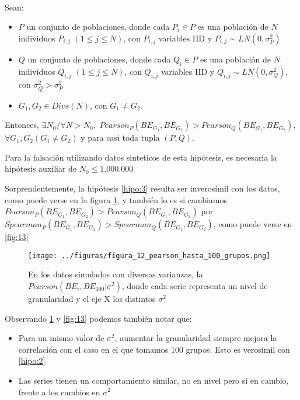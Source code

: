 \begin{hipotesis}\label{hipo:3}
    \\

    Sean:

    \begin{itemize}
    \item $P$ un conjunto de poblaciones, donde cada $P_i \in P$ es una población de $N$ individuos $P_{i,j}$ $(1 \leq j \leq N)$, con $P_{i,j}$ variables IID y $P_{i,j} \sim LN(0,\sigma_P^2)$ 
    \item $Q$ un conjunto de poblaciones, donde cada $Q_i \in P$ es una población de $N$ individuos $Q_{i,j}$ $(1 \leq j \leq N)$, con $Q_{i,j}$ variables IID y $Q_{i,j} \sim LN(0,\sigma_Q^2)$, con $\sigma_Q^2 > \sigma_P^2$
    \item $G_1, G_2 \in Divs(N)$, con $G_1 \neq G_2$.
    \end{itemize}

    
    Entonces, $\exists N_0/ \forall N > N_0, $ $Pearson_P(BE_{G_1},BE_{G_2}) > Pearson_Q(BE_{G_1}, BE_{G_2})$, $\forall G_1, G_2 (G_1 \neq G_2)$ y para casi toda tupla $(P,Q)$.
    

    Para la falsación utilizando datos sinteticos de esta hipótesis, es necesaria la hipótesis auxiliar de $N_0 \leq 1.000.000$
\end{hipotesis}

Sorprendentemente, la hipótesis \ref{hipo:3} resulta ser inverosímil con los datos, como puede verse en la figura \ref{fig:12}, y también lo es si cambiamos $Pearson_P(BE_{G_1},BE_{G_2}) > Pearson_Q(BE_{G_1}, BE_{G_2})$ por $Spearman_P(BE_{G_1},BE_{G_2}) > Spearman_Q(BE_{G_1}, BE_{G_2})$, como puede verse en \ref{fig:13}

\begin{figure}[H]
    \centering 
    \texttt{[image: ../figuras/figura\_12\_pearson\_hasta\_100\_grupos.png]} 
    \caption{En los datos simulados con diversas varianzas, la $Pearson(BE_i,BE_{100} | \sigma^2)$, donde cada serie representa un nivel de granularidad y el eje X los distintos $\sigma^2$}
    \label{fig:12}
\end{figure}

Observando \ref{fig:12}  y \ref{fig:13} podemos también notar que:

\begin{itemize}
    \item Para un mismo valor de $\sigma^2$, aumentar la granularidad siempre mejora la correlación con el caso en el que tomamos 100 grupos. Esto es verosímil con \ref{hipo:2}
    \item Las series tienen un comportamiento similar, no en nivel pero si en cambio, frente a los cambios en $\sigma^2$
\end{itemize}

